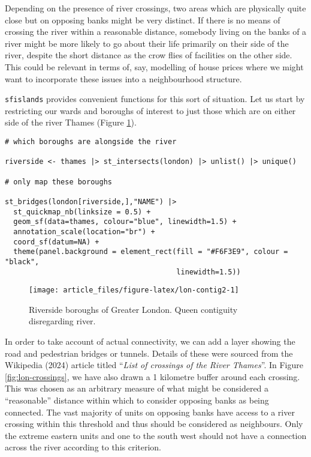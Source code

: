 Depending on the presence of river crossings, two areas which are physically quite close but on opposing banks might be very distinct. If there is no means of crossing the river within a reasonable distance, somebody living on the banks of a river might be more likely to go about their life primarily on their side of the river, despite the short distance as the crow flies of facilities on the other side. This could be relevant in terms of, say, modelling of house prices where we might want to incorporate these issues into a neighbourhood structure.

\texttt{sfislands} provides convenient functions for this sort of situation. Let us start by restricting our wards and boroughs of interest to just those which are on either side of the river Thames (Figure \ref{fig:lon-contig2}).

\begin{verbatim}
# which boroughs are alongside the river

riverside <- thames |> st_intersects(london) |> unlist() |> unique()

# only map these boroughs

st_bridges(london[riverside,],"NAME") |> 
  st_quickmap_nb(linksize = 0.5) +
  geom_sf(data=thames, colour="blue", linewidth=1.5) + 
  annotation_scale(location="br") +
  coord_sf(datum=NA) + 
  theme(panel.background = element_rect(fill = "#F6F3E9", colour = "black", 
                                        linewidth=1.5))
\end{verbatim}

\begin{figure}

{\centering \texttt{[image: article\_files/figure-latex/lon-contig2-1]} 

}

\caption{Riverside boroughs of Greater London. Queen contiguity disregarding river. }\label{fig:lon-contig2}
\end{figure}

In order to take account of actual connectivity, we can add a layer showing the road and pedestrian bridges or tunnels. Details of these were sourced from the Wikipedia (2024) article titled ``\emph{List of crossings of the River Thames}''. In Figure \ref{fig:lon-crossings}, we have also drawn a 1 kilometre buffer around each crossing. This was chosen as an arbitrary measure of what might be considered a ``reasonable'' distance within which to consider opposing banks as being connected. The vast majority of units on opposing banks have access to a river crossing within this threshold and thus should be considered as neighbours. Only the extreme eastern units and one to the south west should not have a connection across the river according to this criterion.

